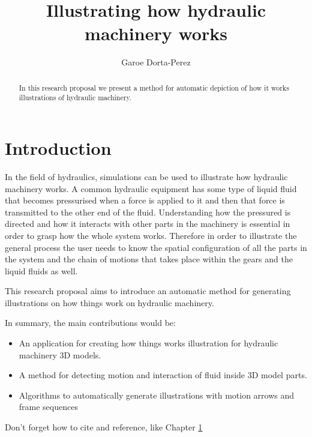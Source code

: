 \documentclass[11pt]{report}
\title{ Illustrating how hydraulic machinery works } \author{Garoe Dorta-Perez}
\begin{document}
\maketitle
\begin{abstract}
In this research proposal we present a method for automatic depiction of how it works illustrations of hydraulic machinery. \end{abstract}


\chapter{Introduction}
\label{ch:intro}
In the field of hydraulics, simulations can be used to illustrate how hydraulic machinery works.
A common hydraulic equipment has 
some type of liquid fluid that becomes pressurised when a force is applied to it and then
that force is transmitted to the other end of the fluid. Understanding how the pressured is
directed and how it interacts with other parts in the machinery is essential in order
to grasp how the whole system works. Therefore in order to illustrate the general 
process the user needs to know the spatial configuration of all the parts in the
system and the chain of motions that takes place within the gears and the liquid fluids
as well.

This research proposal aims to introduce an automatic method for generating
illustrations on how things work on hydraulic machinery. 

In summary, the main contributions would be:
\begin{itemize}
\item An application for creating how things works illustration for hydraulic machinery 3D models.
\item A method for detecting motion and interaction of fluid inside 3D model parts.
\item Algorithms to automatically generate illustrations with motion arrows and frame sequences
\end{itemize}

Don't forget how to cite \cite{Burstall} and reference, like Chapter \ref{ch:intro}
\end{document}
